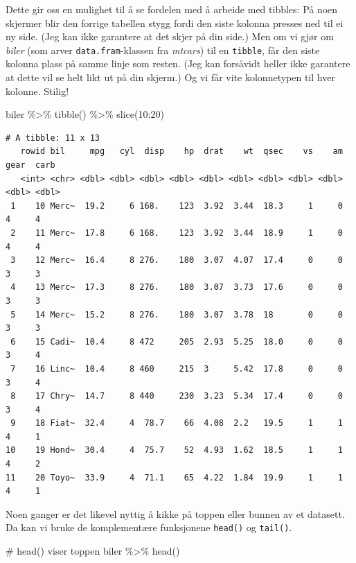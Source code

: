 \documentclass[
  letterpaper,
  DIV=11,
  numbers=noendperiod]{scrreprt}
\newenvironment{Shaded}{\begin{snugshade}}{\end{snugshade}}
\newcommand{\CommentTok}[1]{\textcolor[rgb]{0.37,0.37,0.37}{#1}}
\newcommand{\DecValTok}[1]{\textcolor[rgb]{0.68,0.00,0.00}{#1}}
\newcommand{\FunctionTok}[1]{\textcolor[rgb]{0.28,0.35,0.67}{#1}}
\newcommand{\NormalTok}[1]{\textcolor[rgb]{0.00,0.23,0.31}{#1}}
\newcommand{\SpecialCharTok}[1]{\textcolor[rgb]{0.37,0.37,0.37}{#1}}
\begin{document}
Dette gir oss en mulighet til å se fordelen med å arbeide med tibbles:
På noen skjermer blir den forrige tabellen stygg fordi den siste kolonna
presses ned til ei ny side. (Jeg kan ikke garantere at det skjer på din
side.) Men om vi gjør om \emph{biler} (som arver
\texttt{data.fram}-klassen fra \emph{mtcars}) til en \texttt{tibble},
får den siste kolonna plass på samme linje som resten. (Jeg kan
forsåvidt heller ikke garantere at dette vil se helt likt ut på din
skjerm.) Og vi får vite kolonnetypen til hver kolonne. Stilig!

\begin{Shaded}
\begin{Highlighting}[]
\NormalTok{biler }\SpecialCharTok{\%\textgreater{}\%} 
  \FunctionTok{tibble}\NormalTok{() }\SpecialCharTok{\%\textgreater{}\%} 
  \FunctionTok{slice}\NormalTok{(}\DecValTok{10}\SpecialCharTok{:}\DecValTok{20}\NormalTok{)}
\end{Highlighting}
\end{Shaded}

\begin{verbatim}
# A tibble: 11 x 13
   rowid bil     mpg   cyl  disp    hp  drat    wt  qsec    vs    am  gear  carb
   <int> <chr> <dbl> <dbl> <dbl> <dbl> <dbl> <dbl> <dbl> <dbl> <dbl> <dbl> <dbl>
 1    10 Merc~  19.2     6 168.    123  3.92  3.44  18.3     1     0     4     4
 2    11 Merc~  17.8     6 168.    123  3.92  3.44  18.9     1     0     4     4
 3    12 Merc~  16.4     8 276.    180  3.07  4.07  17.4     0     0     3     3
 4    13 Merc~  17.3     8 276.    180  3.07  3.73  17.6     0     0     3     3
 5    14 Merc~  15.2     8 276.    180  3.07  3.78  18       0     0     3     3
 6    15 Cadi~  10.4     8 472     205  2.93  5.25  18.0     0     0     3     4
 7    16 Linc~  10.4     8 460     215  3     5.42  17.8     0     0     3     4
 8    17 Chry~  14.7     8 440     230  3.23  5.34  17.4     0     0     3     4
 9    18 Fiat~  32.4     4  78.7    66  4.08  2.2   19.5     1     1     4     1
10    19 Hond~  30.4     4  75.7    52  4.93  1.62  18.5     1     1     4     2
11    20 Toyo~  33.9     4  71.1    65  4.22  1.84  19.9     1     1     4     1
\end{verbatim}

Noen ganger er det likevel nyttig å kikke på toppen eller bunnen av et
datasett. Da kan vi bruke de komplementære funksjonene \texttt{head()}
og \texttt{tail()}.

\begin{Shaded}
\begin{Highlighting}[]
\CommentTok{\# \textasciigrave{}head()\textasciigrave{} viser toppen}
\NormalTok{biler }\SpecialCharTok{\%\textgreater{}\%} \FunctionTok{head}\NormalTok{()}
\end{Highlighting}
\end{Shaded}
\end{document}
